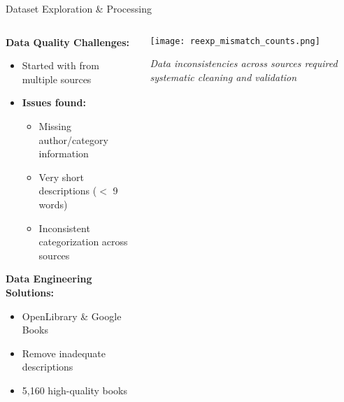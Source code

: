 \begin{frame}{Dataset Exploration \& Processing}
  
\begin{columns}[T]
  \begin{column}{0.55\textwidth}
    \textbf{Data Quality Challenges:}
    \begin{itemize}
      \item Started with  from multiple sources
      \item \textbf{Issues found:}
        \begin{itemize}
          \item Missing author/category information
          \item Very short descriptions ($<$ 9 words)
          \item Inconsistent categorization across sources
        \end{itemize}
    \end{itemize}
    
    \vspace{0.3cm}
    \textbf{Data Engineering Solutions:}
    \begin{itemize}
      \item {} OpenLibrary \& Google Books
      \item {} Remove inadequate descriptions
      \item {} 5,160 high-quality books
    \end{itemize}
  \end{column}

  \begin{column}{0.4\textwidth}
    \centering
    \texttt{[image: reexp\_mismatch\_counts.png]}
    
    \vspace{0.2cm}
    \scriptsize \textit{Data inconsistencies across sources required systematic cleaning and validation}
  \end{column}
\end{columns}
\end{frame}